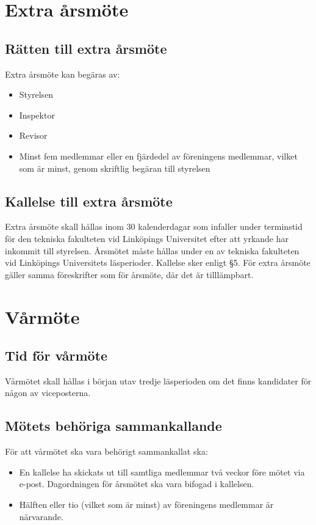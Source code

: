 \documentclass[11pt,a4paper]{article}
\begin{document}
\section{Extra årsmöte}

\subsection{Rätten till extra årsmöte}
Extra årsmöte kan begäras av:
\begin{itemize}
\item Styrelsen
\item Inspektor
\item Revisor
\item Minst fem medlemmar eller en fjärdedel av föreningens medlemmar,
vilket som är minst, genom skriftlig begäran till styrelsen
\end{itemize}
\subsection{Kallelse till extra årsmöte}
Extra årsmöte skall hållas inom 30 kalenderdagar som infaller under
terminstid för den tekniska fakulteten vid Linköpings Universitet efter
att yrkande har inkommit till styrelsen. Årsmötet måste hållas under en av
tekniska fakulteten vid Linköpings Universitets läsperioder. Kallelse sker
enligt \S5. För extra årsmöte gäller samma föreskrifter som för årsmöte, där
det är tilllämpbart.

\section{Vårmöte}

\subsection{Tid för vårmöte}
Vårmötet skall hållas i början utav tredje läsperioden om det finns kandidater för någon av viceposterna.

\subsection{Mötets behöriga sammankallande}
För att vårmötet ska vara behörigt sammankallat ska:
\begin{itemize}
\item En kallelse ha skickats ut till samtliga medlemmar två veckor före mötet via e-post. Dagordningen för årsmötet ska vara bifogad i kallelsen.
\item Hälften eller tio (vilket som är minst) av föreningens medlemmar är närvarande.
\end{itemize}
\end{document}
